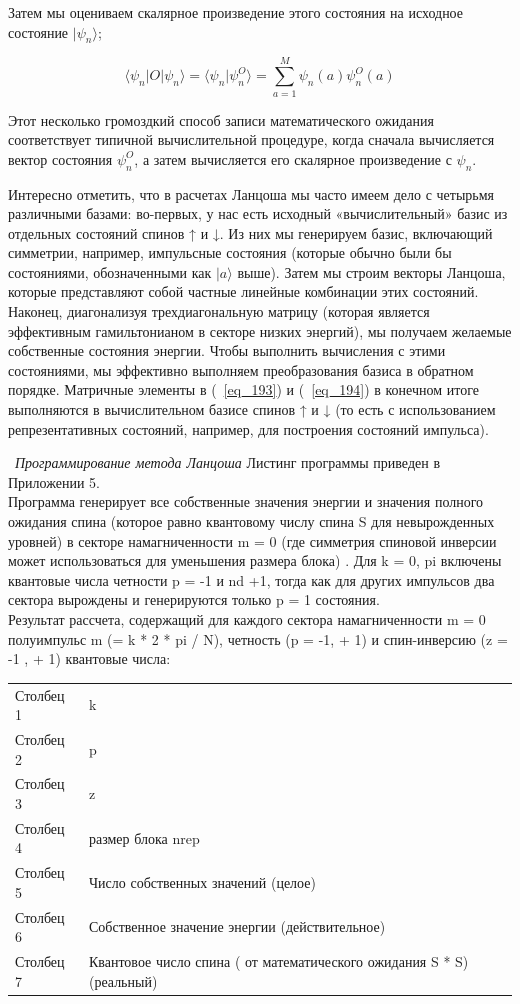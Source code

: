 \documentclass[11pt]{article}
\begin{document}
Затем мы оцениваем скалярное произведение этого состояния на исходное состояние $| \psi_n \rangle $;

\begin{equation*}
\langle \psi_n | O | \psi_n \rangle = \langle \psi_n | \psi_n^O \rangle = \sum\limits_{a=1}^{M}\psi_n(a)\psi_n^O(a)
\label{eq_194}
\end{equation*}

Этот несколько громоздкий способ записи математического ожидания соответствует типичной вычислительной процедуре, когда сначала вычисляется вектор состояния $\psi_n^O$, а затем вычисляется его скалярное произведение с $\psi_n$.

Интересно отметить, что в расчетах Ланцоша мы часто имеем дело с четырьмя различными базами: во-первых, у нас есть исходный «вычислительный» базис из отдельных состояний спинов ↑ и ↓. Из них мы генерируем базис, включающий симметрии, например, импульсные состояния (которые обычно были бы состояниями, обозначенными как $| a \rangle$ выше). Затем мы строим векторы Ланцоша, которые представляют собой частные линейные комбинации этих состояний. Наконец, диагонализуя трехдиагональную матрицу (которая является эффективным гамильтонианом в секторе низких энергий), мы получаем желаемые собственные состояния энергии. Чтобы выполнить вычисления с этими состояниями, мы эффективно выполняем преобразования базиса в обратном порядке. Матричные элементы в (~\ref{eq_193}) и (~\ref{eq_194}) в конечном итоге выполняются в вычислительном базисе спинов ↑ и ↓ (то есть с использованием репрезентативных состояний, например, для построения состояний импульса).

~\emph{Программирование метода Ланцоша}
Листинг программы приведен в Приложении 5. \\

Программа генерирует все собственные значения энергии и значения полного ожидания спина (которое равно квантовому числу спина S для невырожденных уровней) в секторе намагниченности m = 0 (где симметрия спиновой инверсии может использоваться для уменьшения размера блока) . Для k = 0, pi включены квантовые числа четности p = -1 и nd +1, тогда как для других импульсов два сектора вырождены и генерируются только p = 1 состояния. \\

Результат рассчета, содержащий для каждого сектора намагниченности m = 0 полуимпульс m (= k * 2 * pi / N), четность (p = -1, + 1) и спин-инверсию (z = -1 , + 1) квантовые числа:

\begin{tabular}{ll}
Столбец 1 & k \\
Столбец 2 & p  \\
Столбец 3 & z   \\
Столбец 4 & размер блока nrep \\
Столбец 5 & Число собственных значений (целое) \\
Столбец 6 & Собственное значение энергии (действительное) \\
Столбец 7 & Квантовое число спина ( от математического ожидания S * S) (реальный) \\
\end{tabular}\\
\end{document}
